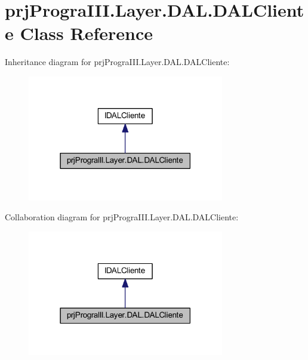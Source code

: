 \hypertarget{classprj_progra_i_i_i_1_1_layer_1_1_d_a_l_1_1_d_a_l_cliente}{}\section{prj\+Progra\+I\+I\+I.\+Layer.\+D\+A\+L.\+D\+A\+L\+Cliente Class Reference}
\label{classprj_progra_i_i_i_1_1_layer_1_1_d_a_l_1_1_d_a_l_cliente}


Inheritance diagram for prj\+Progra\+I\+I\+I.\+Layer.\+D\+A\+L.\+D\+A\+L\+Cliente\+:
\nopagebreak
\begin{figure}[H]
\begin{center}
\leavevmode
\includegraphics[width=243pt]{classprj_progra_i_i_i_1_1_layer_1_1_d_a_l_1_1_d_a_l_cliente__inherit__graph}
\end{center}
\end{figure}


Collaboration diagram for prj\+Progra\+I\+I\+I.\+Layer.\+D\+A\+L.\+D\+A\+L\+Cliente\+:
\nopagebreak
\begin{figure}[H]
\begin{center}
\leavevmode
\includegraphics[width=243pt]{classprj_progra_i_i_i_1_1_layer_1_1_d_a_l_1_1_d_a_l_cliente__coll__graph}
\end{center}
\end{figure}
